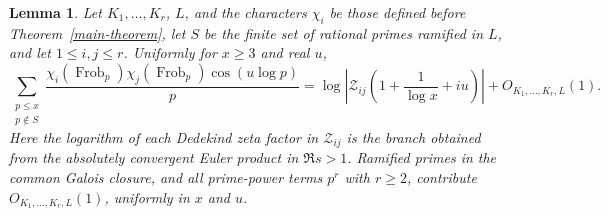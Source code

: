 \documentclass[twoside,reqno,11pt,a4paper]{amsart}
\numberwithin{equation}{section}
\theoremstyle{plain}
\newtheorem{lem}[thm]{Lemma}
\theoremstyle{definition}
\theoremstyle{remark}
\DeclareMathOperator{\Frob}{Frob}
\newcommand{\calZ}{\mathcal Z}
\renewcommand{\le}{\leqslant}
\renewcommand{\ge}{\geqslant}
\begin{document}
\begin{lem}\label{euler-product-comparison}
Let $K_1,\ldots,K_r$, $L$, and the characters $\chi_i$ be those defined before Theorem~\ref{main-theorem}, let $S$ be the finite set of rational primes ramified in $L$, and let $1\le i,j\le r$.  Uniformly for $x\geqslant3$ and real $u$,
\begin{equation*}
        \sum_{\substack{p\le x\\p\notin S}}
        \frac{\chi_i(\Frob_p)\chi_j(\Frob_p)\cos(u\log p)}p
        =
        \log\left|\calZ_{ij}\left(1+\frac1{\log x}+iu\right)\right|
        +O_{K_1,\ldots,K_r,L}(1).
\end{equation*}
Here the logarithm of each Dedekind zeta factor in $\calZ_{ij}$ is the branch obtained from the absolutely convergent Euler product in $\Re s>1$.  Ramified primes in the common Galois closure, and all prime-power terms $p^r$ with $r\ge2$, contribute $O_{K_1,\ldots,K_r,L}(1)$, uniformly in $x$ and $u$.
\end{lem}
\end{document}
